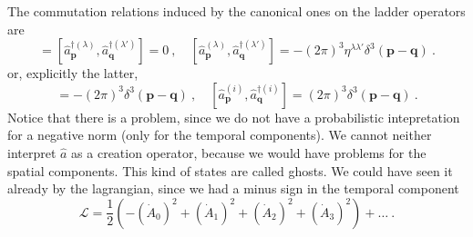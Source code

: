    The commutation relations induced by the canonical ones on the ladder operators are 
    \begin{equation*}
        [\hat a_{\mathbf p}^{(\lambda)}, \hat a_{\mathbf q}^{(\lambda')}] = [\hat a_{\mathbf p}^{\dagger (\lambda)}, \hat a_{\mathbf q}^{\dagger (\lambda')}] = 0 ~, \quad [\hat a_{\mathbf p}^{(\lambda)}, \hat a_{\mathbf q}^{\dagger(\lambda')}] = - (2\pi)^3 \eta^{\lambda \lambda'} \delta^3 (\mathbf p - \mathbf q) ~.
    \end{equation*}
    or, explicitly the latter, 
    \begin{equation*}
        [\hat a_{\mathbf p}^{(0)}, \hat a_{\mathbf q}^{\dagger (0)}] = - (2\pi)^3 \delta^3 (\mathbf p - \mathbf q) ~, \quad [\hat a_{\mathbf p}^{(i)}, \hat a_{\mathbf q}^{\dagger (i)}] = (2\pi)^3 \delta^3 (\mathbf p - \mathbf q) ~.
    \end{equation*}
    Notice that there is a problem, since we do not have a probabilistic intepretation for a negative norm (only for the temporal components). We cannot neither interpret $\hat a$ as a creation operator, because we would have problems for the spatial components. This kind of states are called ghosts. We could have seen it already by the lagrangian, since we had a minus sign in the temporal component
    \begin{equation*}
        \mathcal L = \frac{1}{2} (- (\dot A_0)^2 + (\dot A_1)^2 + (\dot A_2)^2 +(\dot A_3)^2 ) + \ldots ~.
    \end{equation*}

